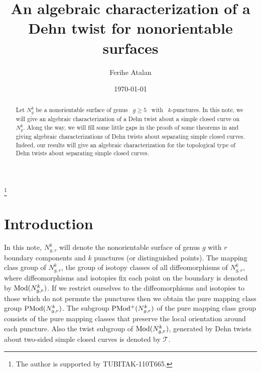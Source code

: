 \documentclass[11 pt]{amsart}
\theoremstyle{definition}
\begin{document}
\title[An Algebraic Characterization of a Dehn Twist for Nonorientable
Surfaces] {An algebraic characterization of a Dehn twist for
nonorientable surfaces}

\author{Ferihe Atalan}
\address{Department of Mathematics, Atilim University,
06836 \newline Ankara, TURKEY} 
\date{\today}
\thanks{The author is supported by TUBITAK-110T665.}
 

\begin{abstract} Let $N_g^k$ be a nonorientable surface of
genus \ $g\geq 5$ \ with \ $k$-punctures. In this note, we will give
an algebraic characterization of a Dehn twist about a simple closed
curve on $N_g^k$. Along the way, we will fill some little gaps in
the proofs of some theorems in \cite{A} and \cite{I1} giving
algebraic characterizations of Dehn twists about separating simple
closed curves. Indeed, our results will give an algebraic
characterization for the topological type of Dehn twists about
separating simple closed curves.
\end{abstract}

\maketitle
\section{Introduction}

In this note, $N_{g,r}^k$  will denote the  nonorientable surface of
genus $g$ with $r$ boundary components and $k$ punctures (or
distinguished points). The mapping class group of $N_{g,r}^k$, the
group of isotopy classes of all diffeomorphisms of $N_{g,r}^k$,
where diffeomorphisms and isotopies fix each point on the boundary
is denoted by ${\rm Mod}(N_{g,r}^k)$. If we restrict ourselves to
the diffeomorphisms and isotopies to those which do not permute the
punctures then we obtain the pure mapping class group ${\rm
PMod}(N_{g,r}^k)$. The subgroup ${\rm PMod^{+}}(N_{g,r}^k)$ of the
pure mapping class group consists of the pure mapping classes that
preserve the local orientation around each puncture. Also the twist
subgroup of ${\rm Mod}(N_{g,r}^k)$, generated by Dehn twists about
two-sided simple closed curves is denoted by $\mathcal{T}$.
\end{document}
